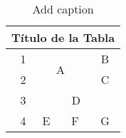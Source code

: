 \documentclass[11pt]{article}
\begin{document}
\begin{table}[htbp]
  \centering
  \caption{Add caption}
    \begin{tabular}{|r|c|c|c|}
    \toprule
    \multicolumn{4}{|c|}{Título de la Tabla} \\
    \midrule
    1     & \multicolumn{2}{c|}{\multirow{2}[4]{*}{A}} & B \\
\cmidrule{1-1}\cmidrule{4-4}    2     & \multicolumn{2}{c|}{} & C \\
    \midrule
    3     & \multicolumn{3}{c|}{D} \\
    \midrule
    4     & E     & F     & G \\
    \bottomrule
    \end{tabular}%
  \label{tab:addlabel}%
\end{table}%
\end{document}

